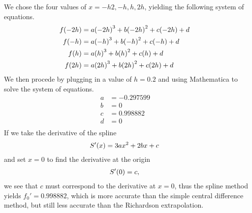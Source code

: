 \documentclass[12pt]{article}
\DeclarePairedDelimiter\rb{(}{)}
\begin{document}
\begin{enumerate}[label=(\alph*)]
        We chose the four values of \(x = {-h2, -h, h, 2h}\), yielding the following system of equations.
        \begin{align*}
            f \rb*{- 2h} & =  a \rb*{-2h}^{3} + b \rb*{-2h}^{2} + c \rb*{-2h} + d &\\
            f \rb*{- h} & =  a \rb*{-h}^{3} + b \rb*{-h}^{2} + c \rb*{-h} + d &\\
            f \rb*{h} & =  a \rb*{h}^{3} + b \rb*{h}^{2} + c \rb*{h} + d &\\
            f \rb*{ 2h} & =  a \rb*{2h}^{3} + b \rb*{2h}^{2} + c \rb*{2h} + d &\\
        \end{align*}
        We then procede by plugging in a value of \(h = 0.2\) and using Mathematica to solve the system of equations. 
        \begin{align*}
            a & =  -0.297599 &\\
            b & =  0 &\\
            c & =  0.998882 &\\
            d & =  0 &\\
        \end{align*}
        If we take the derivative of the spline
        \begin{align*}
            S' \rb*{x} & =  3 a x^{2} + 2 b x + c &\\
        \end{align*}
        and set \(x = 0\) to find the derivative at the origin
        \begin{align*}
            S' \rb*{0} & =  c, &\\
        \end{align*}
        we see that \(c\) must correspond to the derivative at \(x = 0\), thus the spline method yields \(f_{0}'  = 0.998882\), which is more accurate than the simple central difference method, but still less accurate than the Richardson extrapolation. 
\end{enumerate}
\end{document}
